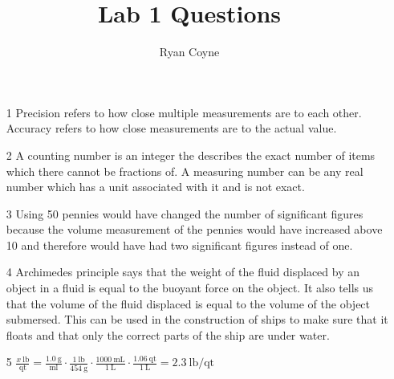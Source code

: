 \documentclass[12pt]{article}
\begin{document}
    \title{Lab 1 Questions}
    \author{Ryan Coyne}
    \maketitle
    \begin{itemize}
        \item[1] Precision refers to how close multiple measurements are to each other. Accuracy refers to how close measurements are to the actual value.
        \item[2] A counting number is an integer the describes the exact number of items which there cannot be fractions of. A measuring number can be any real number which has a unit associated with it and is not exact.
        \item[3] Using 50 pennies would have changed the number of significant figures because the volume measurement of the pennies would have increased above 10 and therefore would have had two significant figures instead of one.
        \item[4] Archimedes principle says that the weight of the fluid displaced by an object in a fluid is equal to the buoyant force on the object. It also tells us that the volume of the fluid displaced is equal to the volume of the object submersed. This can be used in the construction of ships to make sure that it floats and that only the correct parts of the ship are under water.
        \item[5] \(\frac{x~\mathrm{lb}}{\mathrm{qt}} = \frac{1.0~\mathrm{g}}{\mathrm{ml}} \cdot \frac{1~\mathrm{lb}}{454~\mathrm{g}} \cdot \frac{1000~\mathrm{mL}}{1~\mathrm{L}} \cdot \frac{1.06~\mathrm{qt}}{1~\mathrm{L}} = 2.3~\mathrm{lb/qt}\)
    \end{itemize}
\end{document}
